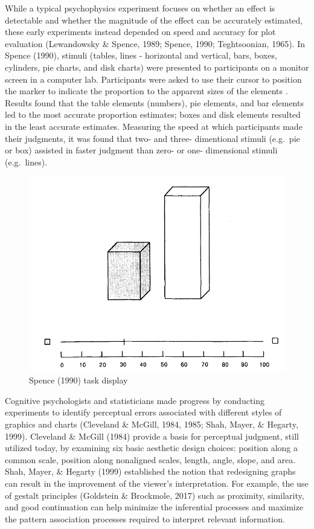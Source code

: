 \documentclass[print]{nuthesis}
\begin{document}
While a typical psychophysics experiment focuses on whether an effect is detectable and whether the magnitude of the effect can be accurately estimated, these early experiments instead depended on speed and accuracy for plot evaluation (Lewandowsky \& Spence, 1989; Spence, 1990; Teghtsoonian, 1965).
In Spence (1990), stimuli (tables, lines - horizontal and vertical, bars, boxes, cylinders, pie charts, and disk charts) were presented to participants on a monitor screen in a computer lab.
Participants were asked to use their cursor to position the marker to indicate the proportion to the apparent sizes of the elements .
Results found that the table elements (numbers), pie elements, and bar elements led to the most accurate proportion estimates; boxes and disk elements resulted in the least accurate estimates.
Measuring the speed at which participants made their judgments, it was found that two- and three- dimentional stimuli (e.g.~pie or box) assisted in faster judgment than zero- or one- dimensional stimuli (e.g.~lines).

\begin{figure}[tbp]

{\centering \includegraphics[width=0.75\linewidth,]{images/spence-1990-proportion} 

}

\caption{Spence (1990) task display}\label{fig:spence-1990-proportion}
\end{figure}

Cognitive psychologists and statisticians made progress by conducting experiments to identify perceptual errors associated with different styles of graphics and charts (Cleveland \& McGill, 1984, 1985; Shah, Mayer, \& Hegarty, 1999).
Cleveland \& McGill (1984) provide a basis for perceptual judgment, still utilized today, by examining six basic aesthetic design choices: position along a common scale, position along nonaligned scales, length, angle, slope, and area.
Shah, Mayer, \& Hegarty (1999) established the notion that redesigning graphs can result in the improvement of the viewer's interpretation.
For example, the use of gestalt principles (Goldstein \& Brockmole, 2017) such as proximity, similarity, and good continuation can help minimize the inferential processes and maximize the pattern association processes required to interpret relevant information.
\end{document}
